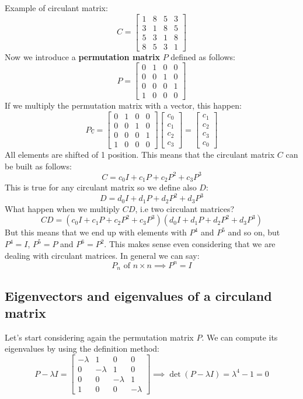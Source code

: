 Example of circulant matrix:
\[
    C = \begin{bmatrix}
        1 & 8 & 5 & 3\\
        3 & 1 & 8 & 5\\
        5 & 3 & 1 & 8\\
        8 & 5 & 3 & 1
    \end{bmatrix}    
\]
Now we introduce a \textbf{permutation matrix} $P$ defined as follows:
\[
    P = \begin{bmatrix}
        0 & 1 & 0 & 0\\
        0 & 0 & 1 & 0\\
        0 & 0 & 0 & 1\\
        1 & 0 & 0 & 0
    \end{bmatrix}
\]
If we multiply the permutation matrix with a vector, this happen:
\[
    P \underline{c} = \begin{bmatrix}
        0 & 1 & 0 & 0\\
        0 & 0 & 1 & 0\\
        0 & 0 & 0 & 1\\
        1 & 0 & 0 & 0
    \end{bmatrix} \begin{bmatrix}
        c_0\\
        c_1\\
        c_2\\
        c_3
    \end{bmatrix} = \begin{bmatrix}
        c_1\\
        c_2\\
        c_3\\
        c_0
    \end{bmatrix}    
\]
All elements are shifted of 1 position. This means that the circulant matrix $C$ can be built as follows:
\[
    C = c_0 I + c_1 P + c_2 P^2 + c_3 P^3    
\]
This is true for any circulant matrix so we define also $D$:
\[
    D = d_0 I + d_1 P + d_2 P^2 + d_3 P^3 
\]
What happen when we multiply $CD$, i.e two circulant matrices?
\[
    CD = (c_0 I + c_1 P + c_2 P^2 + c_3 P^3)(d_0 I + d_1 P + d_2 P^2 + d_3 P^3)
\]
But this means that we end up with elements with $P^4$ and $P^5$ and so on, but $P^4 = I$, $P^5 = P$ and $P^6 = P^2$. This makes sense even considering that we are dealing with circulant matrices. In general we can say:
\[
    P_n \text{ of } n \times n \implies P^n = I    
\]


\subsection*{Eigenvectors and eigenvalues of a circuland matrix}
Let's start considering again the permutation matrix $P$. We can compute its eigenvalues by using the definition method:
\[
    P - \lambda I = \begin{bmatrix}
        -\lambda & 1 & 0 & 0\\
        0 & -\lambda & 1 & 0\\
        0 & 0 & -\lambda & 1\\
        1 & 0 & 0 & -\lambda
    \end{bmatrix}
    \implies
    \det(P - \lambda I) = \lambda^4 - 1 = 0
\]

